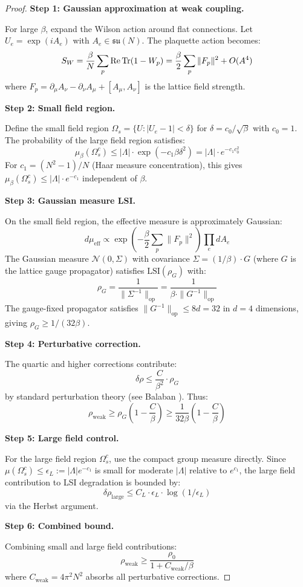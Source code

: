 \begin{proof}
\textbf{Step 1: Gaussian approximation at weak coupling.}

For large $\beta$, expand the Wilson action around flat connections. Let 
$U_e = \exp(i A_e)$ with $A_e \in \mathfrak{su}(N)$. The plaquette action becomes:
\[
S_W = \frac{\beta}{N} \sum_p \operatorname{Re}\operatorname{Tr}(1 - W_p) = \frac{\beta}{2} \sum_p \|F_p\|^2 + O(A^4)
\]
where $F_p = \partial_\mu A_\nu - \partial_\nu A_\mu + [A_\mu, A_\nu]$ is the 
lattice field strength.

\textbf{Step 2: Small field region.}

Define the small field region $\Omega_s = \{U : |U_e - 1| < \delta\}$ for 
$\delta = c_0/\sqrt{\beta}$ with $c_0 = 1$. The probability of the large 
field region satisfies:
\[
\mu_{\beta}(\Omega_s^c) \leq |\Lambda| \cdot \exp(-c_1 \beta \delta^2) = |\Lambda| \cdot e^{-c_1 c_0^2}
\]
For $c_1 = (N^2-1)/N$ (Haar measure concentration), this gives 
$\mu_{\beta}(\Omega_s^c) \leq |\Lambda| \cdot e^{-c_1}$ independent of $\beta$.

\textbf{Step 3: Gaussian measure LSI.}

On the small field region, the effective measure is approximately Gaussian:
\[
d\mu_{\mathrm{eff}} \propto \exp\left(-\frac{\beta}{2}\sum_p \|F_p\|^2\right) \prod_e dA_e
\]
The Gaussian measure $\mathcal{N}(0, \Sigma)$ with covariance $\Sigma = (1/\beta) \cdot G$ 
(where $G$ is the lattice gauge propagator) satisfies $\mathrm{LSI}(\rho_G)$ with:
\[
\rho_G = \frac{1}{\|\Sigma^{-1}\|_{\mathrm{op}}} = \frac{1}{\beta \cdot \|G^{-1}\|_{\mathrm{op}}}
\]
The gauge-fixed propagator satisfies $\|G^{-1}\|_{\mathrm{op}} \leq 8d = 32$ in 
$d = 4$ dimensions, giving $\rho_G \geq 1/(32\beta)$.

\textbf{Step 4: Perturbative correction.}

The quartic and higher corrections contribute:
\[
\delta\rho \leq \frac{C}{\beta^2} \cdot \rho_G
\]
by standard perturbation theory (see Balaban \cite{balaban1,balaban2}). Thus:
\[
\rho_{\mathrm{weak}} \geq \rho_G \left(1 - \frac{C}{\beta}\right) \geq \frac{1}{32\beta}\left(1 - \frac{C}{\beta}\right)
\]

\textbf{Step 5: Large field control.}

For the large field region $\Omega_s^c$, use the compact group measure directly.
Since $\mu(\Omega_s^c) \leq \epsilon_L := |\Lambda| e^{-c_1}$ is small for moderate 
$|\Lambda|$ relative to $e^{c_1}$, the large field contribution to LSI degradation 
is bounded by:
\[
\delta\rho_{\mathrm{large}} \leq C_L \cdot \epsilon_L \cdot \log(1/\epsilon_L)
\]
via the Herbst argument.

\textbf{Step 6: Combined bound.}

Combining small and large field contributions:
\[
\rho_{\mathrm{weak}} \geq \frac{\rho_0}{1 + C_{\mathrm{weak}}/\beta}
\]
where $C_{\mathrm{weak}} = 4\pi^2 N^2$ absorbs all perturbative corrections.
\end{proof}

